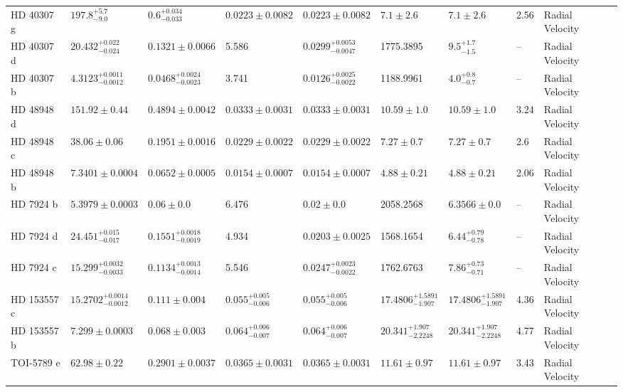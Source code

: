 \begin{tabular}{llllllllll}
HD 40307 g & $197.8^{+5.7}_{-9.0}$ & $0.6^{+0.034}_{-0.033}$ & $0.0223 \pm 0.0082$ & $0.0223 \pm 0.0082$ & $7.1 \pm 2.6$ & $7.1 \pm 2.6$ & 2.56 & Radial Velocity & \cite{TUOMI_ET_AL__2013} \\
HD 40307 d & $20.432^{+0.022}_{-0.024}$ & $0.1321 \pm 0.0066$ & 5.586 & $0.0299^{+0.0053}_{-0.0047}$ & 1775.3895 & $9.5^{+1.7}_{-1.5}$ & -- & Radial Velocity & \cite{TUOMI_ET_AL__2013} \\
HD 40307 b & $4.3123^{+0.0011}_{-0.0012}$ & $0.0468^{+0.0024}_{-0.0023}$ & 3.741 & $0.0126^{+0.0025}_{-0.0022}$ & 1188.9961 & $4.0^{+0.8}_{-0.7}$ & -- & Radial Velocity & \cite{TUOMI_ET_AL__2013} \\
HD 48948 d & $151.92 \pm 0.44$ & $0.4894 \pm 0.0042$ & $0.0333 \pm 0.0031$ & $0.0333 \pm 0.0031$ & $10.59 \pm 1.0$ & $10.59 \pm 1.0$ & 3.24 & Radial Velocity & \cite{DALAL_ET_AL__2024} \\
HD 48948 c & $38.06 \pm 0.06$ & $0.1951 \pm 0.0016$ & $0.0229 \pm 0.0022$ & $0.0229 \pm 0.0022$ & $7.27 \pm 0.7$ & $7.27 \pm 0.7$ & 2.6 & Radial Velocity & \cite{DALAL_ET_AL__2024} \\
HD 48948 b & $7.3401 \pm 0.0004$ & $0.0652 \pm 0.0005$ & $0.0154 \pm 0.0007$ & $0.0154 \pm 0.0007$ & $4.88 \pm 0.21$ & $4.88 \pm 0.21$ & 2.06 & Radial Velocity & \cite{DALAL_ET_AL__2024} \\
HD 7924 b & $5.3979 \pm 0.0003$ & $0.06 \pm 0.0$ & 6.476 & $0.02 \pm 0.0$ & 2058.2568 & $6.3566 \pm 0.0$ & -- & Radial Velocity & \cite{STASSUN_ET_AL__2017} \\
HD 7924 d & $24.451^{+0.015}_{-0.017}$ & $0.1551^{+0.0018}_{-0.0019}$ & 4.934 & $0.0203 \pm 0.0025$ & 1568.1654 & $6.44^{+0.79}_{-0.78}$ & -- & Radial Velocity & \cite{FULTON_ET_AL__2015} \\
HD 7924 c & $15.299^{+0.0032}_{-0.0033}$ & $0.1134^{+0.0013}_{-0.0014}$ & 5.546 & $0.0247^{+0.0023}_{-0.0022}$ & 1762.6763 & $7.86^{+0.73}_{-0.71}$ & -- & Radial Velocity & \cite{FULTON_ET_AL__2015} \\
HD 153557 c & $15.2702^{+0.0014}_{-0.0012}$ & $0.111 \pm 0.004$ & $0.055^{+0.005}_{-0.006}$ & $0.055^{+0.005}_{-0.006}$ & $17.4806^{+1.5891}_{-1.907}$ & $17.4806^{+1.5891}_{-1.907}$ & 4.36 & Radial Velocity & \cite{FENG_ET_AL__2022} \\
HD 153557 b & $7.299 \pm 0.0003$ & $0.068 \pm 0.003$ & $0.064^{+0.006}_{-0.007}$ & $0.064^{+0.006}_{-0.007}$ & $20.341^{+1.907}_{-2.2248}$ & $20.341^{+1.907}_{-2.2248}$ & 4.77 & Radial Velocity & \cite{FENG_ET_AL__2022} \\
TOI-5789 e & $62.98 \pm 0.22$ & $0.2901 \pm 0.0037$ & $0.0365 \pm 0.0031$ & $0.0365 \pm 0.0031$ & $11.61 \pm 0.97$ & $11.61 \pm 0.97$ & 3.43 & Radial Velocity & \cite{BONOMO_ET_AL_2026} \\

\end{tabular}
